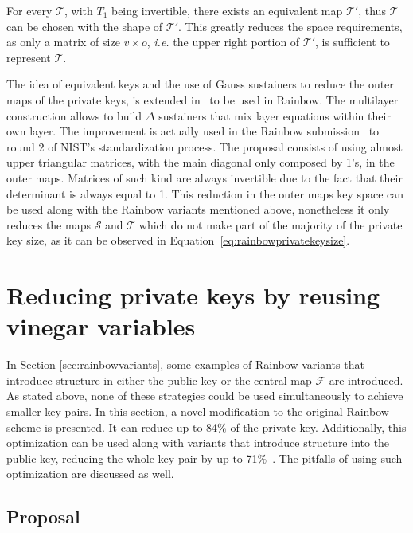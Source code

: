 \documentclass{ufsctex/ufsctex}
\begin{document}
For every $\mathcal{T}$, with $T_1$ being invertible, there exists an
equivalent map $\mathcal{T'}$, thus $\mathcal{T}$ can be chosen with the shape
of $\mathcal{T'}$. This greatly reduces the space requirements, as only a
matrix of size $v \times o$, \textit{i.e.} the upper right portion of
$\mathcal{T'}$, is sufficient to represent $\mathcal{T}$.

The idea of equivalent keys and the use of Gauss sustainers to reduce the outer
maps of the private keys, is extended in~\cite[Chapter 3.5]{petzoldt2013thesis}
to be used in Rainbow. The multilayer construction allows to build $\Delta$
sustainers that mix layer equations within their own layer. The improvement is
actually used in the Rainbow submission~\cite{ding2019nist} to round 2 of
NIST's standardization process. The proposal consists of using almost upper
triangular matrices, with the main diagonal only composed by 1's, in the outer
maps. Matrices of such kind are always invertible due to the fact that their
determinant is always equal to 1. This reduction in the outer maps key space
can be used along with the Rainbow variants mentioned above, nonetheless it
only reduces the maps $\mathcal{S}$ and $\mathcal{T}$ which do not make part of
the majority of the private key size, as it can be observed in
Equation~\ref{eq:rainbowprivatekeysize}.

\chapter{Reducing private keys by reusing vinegar variables}

In Section \ref{sec:rainbowvariants}, some examples of Rainbow variants that
introduce structure in either the public key or the central map $\mathcal{F}$
are introduced. As stated above, none of these strategies could be used
simultaneously to achieve smaller key pairs. In this section, a novel
modification to the original Rainbow scheme is presented. It can reduce up to
84\% of the private key. Additionally, this optimization can be used along with
variants that introduce structure into the public key, reducing the whole key
pair by up to 71\%~\cite{zambonin2019handling}. The pitfalls of using such
optimization are discussed as well.

\section{Proposal}\label{sec:proposal}
\end{document}
